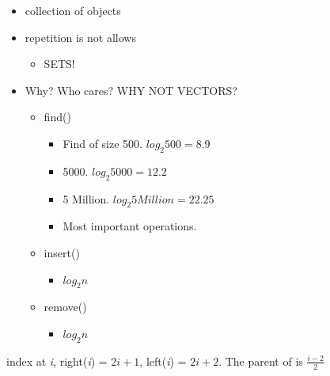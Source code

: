 \documentclass{article}
\begin{document}
\begin{itemize}
\item collection of objects
\item repetition is not allows
    \begin{itemize}
    \item SETS!
    \end{itemize}
\item Why? Who cares? WHY NOT VECTORS?
    \begin{itemize}
    \item find()
        \begin{itemize}
        \item Find of size 500. $log_2 500 = 8.9$
        \item 5000. $log_2 5000 = 12.2$
        \item 5 Million. $log_2 5 Million = 22.25$
        \item Most important operations.
        \end{itemize}
    \item insert()
        \begin{itemize}
        \item $log_2 n$
        \end{itemize}
    \item remove()
        \begin{itemize}
        \item $log_2 n$
        \end{itemize}
    \end{itemize}
\end{itemize}

index at \textit{i}, right(\textit{i}) = $2i + 1$, left(\textit{i}) = $2i + 2$. The parent of is $\frac{i - 2}{2}$
\end{document}
